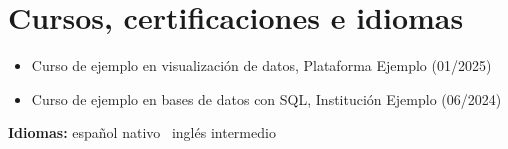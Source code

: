 \documentclass[10pt,a4paper]{article}
\newif\ifanexos     \anexosfalse
\begin{document}
\section{Cursos, certificaciones e idiomas}
\begin{itemize}[itemsep=0pt]
  \item Curso de ejemplo en visualización de datos, Plataforma Ejemplo (01/2025)
  \item Curso de ejemplo en bases de datos con SQL, Institución Ejemplo (06/2024)
\end{itemize}
\vspace{2pt}\noindent\textbf{Idiomas:} español nativo \textbar\ inglés intermedio

\ifanexos
\newpage

\fi
\end{document}
